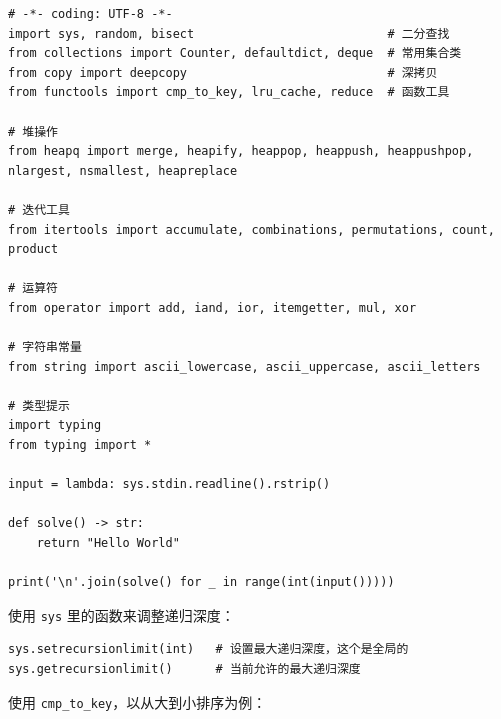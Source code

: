 

\begin{lstlisting}[style=Python]
# -*- coding: UTF-8 -*-
import sys, random, bisect                           # 二分查找
from collections import Counter, defaultdict, deque  # 常用集合类
from copy import deepcopy                            # 深拷贝
from functools import cmp_to_key, lru_cache, reduce  # 函数工具

# 堆操作
from heapq import merge, heapify, heappop, heappush, heappushpop, nlargest, nsmallest, heapreplace

# 迭代工具
from itertools import accumulate, combinations, permutations, count, product

# 运算符
from operator import add, iand, ior, itemgetter, mul, xor

# 字符串常量
from string import ascii_lowercase, ascii_uppercase, ascii_letters

# 类型提示
import typing
from typing import *

input = lambda: sys.stdin.readline().rstrip()

def solve() -> str:
    return "Hello World"

print('\n'.join(solve() for _ in range(int(input()))))
\end{lstlisting}

\newpage


使用 \texttt{sys} 里的函数来调整递归深度：

\begin{lstlisting}[style=Python]
sys.setrecursionlimit(int)   # 设置最大递归深度，这个是全局的
sys.getrecursionlimit()      # 当前允许的最大递归深度
\end{lstlisting}


使用 \texttt{cmp\_to\_key}，以从大到小排序为例：

